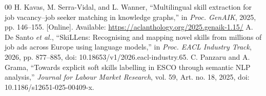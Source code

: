 \documentclass[conference]{IEEEtran}
\begin{document}
\begin{thebibliography}{00}
 H. Kavas, M. Serra-Vidal, and L. Wanner, ``Multilingual skill extraction for job vacancy--job seeker matching in knowledge graphs,'' in \emph{Proc. GenAIK}, 2025, pp. 146--155. [Online]. Available: \url{https://aclanthology.org/2025.genaik-1.15/}
 A. De Santo \emph{et al.}, ``SkiLLens: Recognising and mapping novel skills from millions of job ads across Europe using language models,'' in \emph{Proc. EACL Industry Track}, 2026, pp. 877--885, doi: 10.18653/v1/2026.eacl-industry.65.
 C. Panzaru and A. Grama, ``Towards explicit soft skills labelling in ESCO through semantic NLP analysis,'' \emph{Journal for Labour Market Research}, vol. 59, Art. no. 18, 2025, doi: 10.1186/s12651-025-00409-x.
\end{thebibliography}
\end{document}
